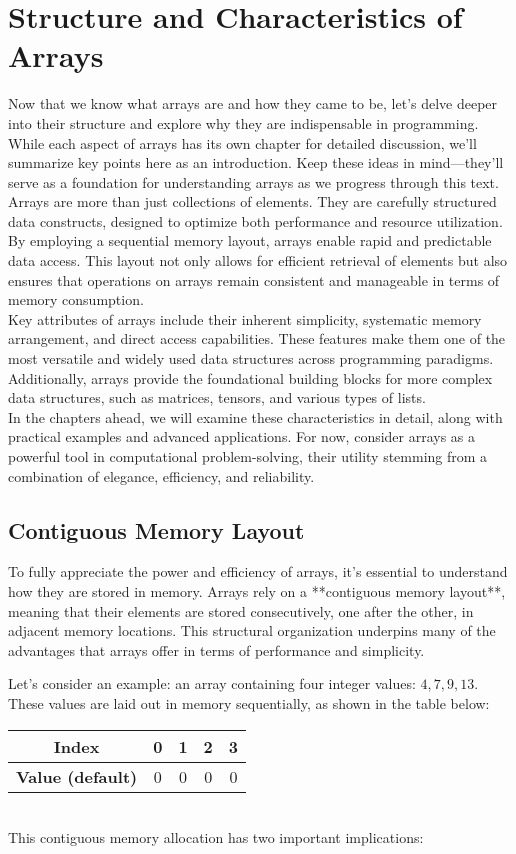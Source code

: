\documentclass[12pt, oneside]{book}
\begin{document}
\section{Structure and Characteristics of Arrays}
Now that we know what arrays are and how they came to be, let’s delve deeper into their structure and explore why they are indispensable in programming. While each aspect of arrays has its own chapter for detailed discussion, we’ll summarize key points here as an introduction. Keep these ideas in mind—they'll serve as a foundation for understanding arrays as we progress through this text.\\
Arrays are more than just collections of elements. They are carefully structured data constructs, designed to optimize both performance and resource utilization. By employing a sequential memory layout, arrays enable rapid and predictable data access. This layout not only allows for efficient retrieval of elements but also ensures that operations on arrays remain consistent and manageable in terms of memory consumption.\\
Key attributes of arrays include their inherent simplicity, systematic memory arrangement, and direct access capabilities. These features make them one of the most versatile and widely used data structures across programming paradigms. Additionally, arrays provide the foundational building blocks for more complex data structures, such as matrices, tensors, and various types of lists.\\
In the chapters ahead, we will examine these characteristics in detail, along with practical examples and advanced applications. For now, consider arrays as a powerful tool in computational problem-solving, their utility stemming from a combination of elegance, efficiency, and reliability.
\subsection{Contiguous Memory Layout}
To fully appreciate the power and efficiency of arrays, it’s essential to understand how they are stored in memory. Arrays rely on a **contiguous memory layout**, meaning that their elements are stored consecutively, one after the other, in adjacent memory locations. This structural organization underpins many of the advantages that arrays offer in terms of performance and simplicity.

Let’s consider an example: an array containing four integer values: \(4, 7, 9, 13\). These values are laid out in memory sequentially, as shown in the table below:
\begin{table}[ht]
	\centering
	\begin{tabular}{|c|c|c|c|c|}
		\hline
		\textbf{Index} & 0 & 1 & 2 & 3 \\ 
		\hline
		\textbf{Value (default)} & 0 & 0 & 0 & 0 \\ 
		\hline
	\end{tabular}
\end{table}
\\
This contiguous memory allocation has two important implications:
  
\end{document}
